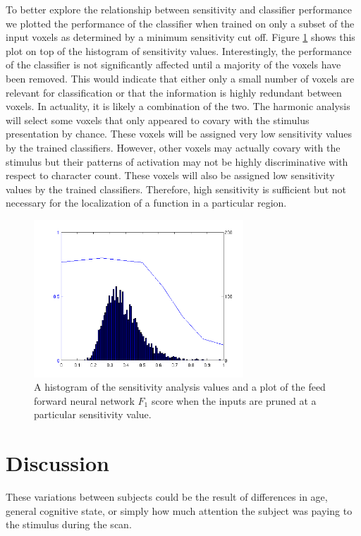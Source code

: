 \documentclass[preprint,authoryear,12pt]{elsarticle}
\begin{document}
To better explore the relationship between sensitivity and classifier performance we plotted the performance of the classifier when trained on only a subset of the input voxels as determined by a minimum sensitivity cut off.
Figure \ref{fig:sensitivity-cutoff} shows this plot on top of the histogram of sensitivity values.
Interestingly, the performance of the classifier is not significantly affected until a majority of the voxels have been removed.
This would indicate that either only a small number of voxels are relevant for classification or that the information is highly redundant between voxels.
In actuality, it is likely a combination of the two.
The harmonic analysis will select some voxels that only appeared to covary with the stimulus presentation by chance.
These voxels will be assigned very low sensitivity values by the trained classifiers.
However, other voxels may actually covary with the stimulus but their patterns of activation may not be highly discriminative with respect to character count.
These voxels will also be assigned low sensitivity values by the trained classifiers.
Therefore, high sensitivity is sufficient but not necessary for the localization of a function in a particular region.

\begin{figure}
\centering
\includegraphics[width=0.7\textwidth]{figures/sensitivity-cutoff}
\caption{A histogram of the sensitivity analysis values and a plot of the feed forward neural network $F_1$ score when the inputs are pruned at a particular sensitivity value. }
\label{fig:sensitivity-cutoff}
\end{figure}

\section{Discussion}
These variations between subjects could be the result of differences in age, general cognitive state, or simply how much attention the subject was paying to the stimulus during the scan.
\end{document}
